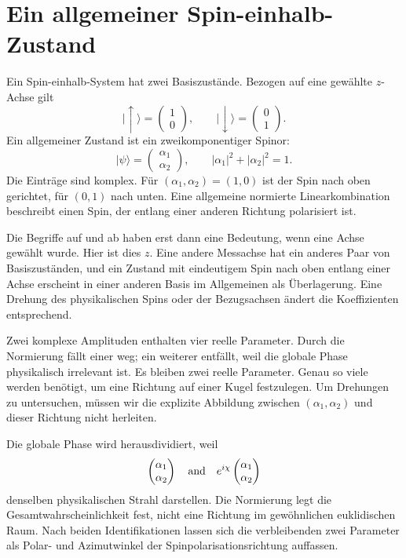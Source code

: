 \section{Ein allgemeiner Spin-einhalb-Zustand}

Ein Spin-einhalb-System hat zwei Basiszustände. Bezogen auf eine gewählte \(z\)-Achse gilt
\begin{equation}
\lvert\uparrow\rangle=
\begin{pmatrix}1\\0\end{pmatrix},
\qquad
\lvert\downarrow\rangle=
\begin{pmatrix}0\\1\end{pmatrix}.
\end{equation}
Ein allgemeiner Zustand ist ein zweikomponentiger Spinor:
\begin{equation}
\lvert\psi\rangle=
\begin{pmatrix}\alpha_1\\\alpha_2\end{pmatrix},
\qquad
|\alpha_1|^2+|\alpha_2|^2=1.
\label{eq:l3-spinor}
\end{equation}
Die Einträge sind komplex. Für \((\alpha_1,\alpha_2)=(1,0)\) ist der Spin nach oben gerichtet, für \((0,1)\) nach unten. Eine allgemeine normierte Linearkombination beschreibt einen Spin, der entlang einer anderen Richtung polarisiert ist.

Die Begriffe {auf} und {ab} haben erst dann eine Bedeutung, wenn eine Achse gewählt wurde. Hier ist dies \(z\). Eine andere Messachse hat ein anderes Paar von Basiszuständen, und ein Zustand mit eindeutigem Spin nach oben entlang einer Achse erscheint in einer anderen Basis im Allgemeinen als Überlagerung. Eine Drehung des physikalischen Spins oder der Bezugsachsen ändert die Koeffizienten entsprechend.

Zwei komplexe Amplituden enthalten vier reelle Parameter. Durch die Normierung fällt einer weg; ein weiterer entfällt, weil die globale Phase physikalisch irrelevant ist. Es bleiben zwei reelle Parameter. Genau so viele werden benötigt, um eine Richtung auf einer Kugel festzulegen. Um Drehungen zu untersuchen, müssen wir die explizite Abbildung zwischen \((\alpha_1,\alpha_2)\) und dieser Richtung nicht herleiten.

Die globale Phase wird herausdividiert, weil
\begin{equation}
\begin{pmatrix}\alpha_1\\\alpha_2\end{pmatrix}
\quad\hbox{and}\quad
e^{i\chi}
\begin{pmatrix}\alpha_1\\\alpha_2\end{pmatrix}
\end{equation}
denselben physikalischen Strahl darstellen. Die Normierung legt die Gesamtwahrscheinlichkeit fest, nicht eine Richtung im gewöhnlichen euklidischen Raum. Nach beiden Identifikationen lassen sich die verbleibenden zwei Parameter als Polar- und Azimutwinkel der Spinpolarisationsrichtung auffassen.

